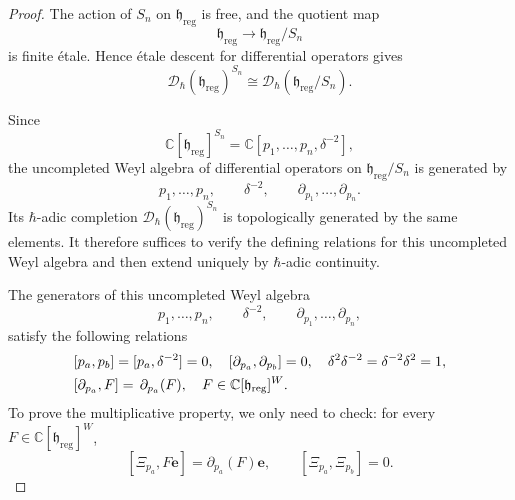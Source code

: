 \documentclass[10pt,a4paper]{amsart}
\newcommand{\bbC}{\mathbb{C}}
\newcommand{\be}{\mathbf{e}}
\newcommand{\fkh}{\mathfrak{h}}
\newcommand{\mD}{\mathcal{D}}
\newcommand{\reg}{\mathrm{reg}}
\begin{document}
\begin{proof}
	The action of \(S_n\) on \(\fkh_{\reg}\) is free, and the quotient map
\[
\fkh_{\reg}\longrightarrow\fkh_{\reg}/S_n
\]
is finite \'etale. Hence \'etale descent for
differential operators gives
\[
\mD_\hbar(\fkh_{\reg})^{S_n}
\cong
\mD_\hbar(\fkh_{\reg}/S_n).
\]


Since
\[
\bbC[\fkh_{\reg}]^{S_n}
=
\bbC[p_1,\ldots,p_n,\delta^{-2}],
\]
	the uncompleted Weyl algebra of differential operators on
	\(\fkh_{\reg}/S_n\) is generated by
\[
p_1,\ldots,p_n,
\qquad
\delta^{-2},
\qquad
\partial_{p_1},\ldots,\partial_{p_n}.
\]
Its \(\hbar\)-adic completion
\(\mD_\hbar(\fkh_{\reg})^{S_n}\) is topologically generated by the same elements.
It therefore suffices to verify the defining relations for
this uncompleted Weyl algebra and then extend uniquely by
\(\hbar\)-adic continuity.


The generators of this uncompleted Weyl algebra
\[
p_1,\ldots,p_n,
\qquad
\delta^{-2},
\qquad
\partial_{p_1},\ldots,\partial_{p_n},
\]
 satisfy the following relations
	\begin{equation}\label{eq:power-sum-differential-relations}
	\begin{aligned}&
	\relax [p_a,p_b]=[p_a, \delta^{-2}]=0,\quad
	[\partial_{p_a},\partial_{p_b}]=0,
	\quad \delta^2 \delta^{-2} = \delta^{-2} \delta^{2} = 1,
	\\
	& [\partial_{p_a},F]
	  =\,\partial_{p_a}(F),
	  \quad
	  F\in\bbC[\fkh_{\reg}]^W.
	\end{aligned}
	\end{equation}
	To prove the multiplicative property, 
	we only need to check: for every
	\(F\in\bbC[\fkh_{\reg}]^W\),
	\begin{equation}\label{eq:Cherednik-power-sum-Weyl-relation}
	  [ \Xi_{p_a} ,F \be]
	  =
	  \partial_{p_a}(F) \be,
	  \qquad
	  [ \Xi_{p_a} ,\Xi_{p_b}]
	  =
	  0.
	\end{equation}
	

\end{proof}
\end{document}
